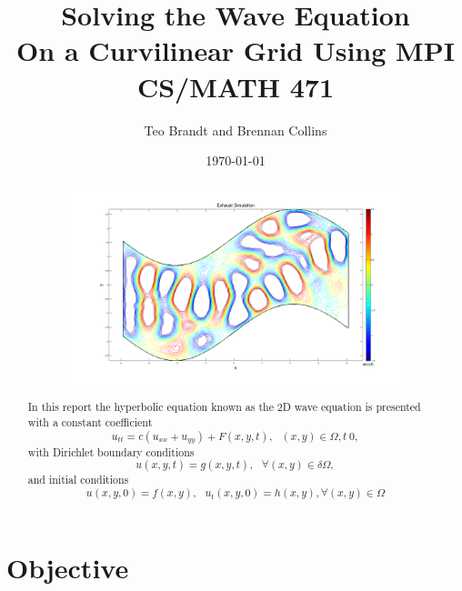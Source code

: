 \documentclass{article}
\title{Solving the Wave Equation\\On a Curvilinear Grid Using MPI\\ CS/MATH 471} %
\author{Teo Brandt and Brennan Collins} %
\date{\today} %
\begin{document}
\maketitle %



\begin{abstract}
\begin{figure}[h]
\centering
\includegraphics[width=1.0\textwidth]{exhaust_sim_10}
\end{figure}
In this report the hyperbolic equation known as the 2D wave equation is presented with a constant coefficient
\[
u_{tt}=c(u_{xx}+u_{yy})+F(x,y,t),\text{   }(x,y)\in \Omega, t\>0,
\]
with Dirichlet boundary conditions
\[
u(x,y,t)=g(x,y,t),\text{   }\forall (x,y) \in \delta \Omega,
\]
and initial conditions
\[
u(x,y,0) = f(x,y),\text{   }u_{t}(x,y,0)=h(x,y), \forall (x,y) \in \Omega
\]
\end{abstract}
\newpage

\section{Objective}
\end{document}

